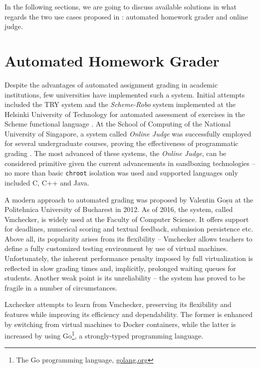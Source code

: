 In the following sections, we are going to discuss available solutions in what regards the two use cases proposed in : automated homework grader and online judge.


\section{Automated Homework Grader}
\label{sec:homework}

Despite the advantages of automated assignment grading in academic institutions, few universities have implemented such a system. Initial attempts included the TRY\cite{reek} system and the \textit{Scheme-Robo}\cite{saikkonen} system implemented at the Helsinki University of Technology for automated assessment of exercises in the Scheme functional language \cite{cheang}. At the School of Computing of the National University of Singapore, a system called \textit{Online Judge} was successfully employed for several undergraduate courses, proving the effectiveness of programmatic grading \cite{cheang}. The most advanced of these systems, the \textit{Online Judge}, can be considered primitive given the current advancements in sandboxing technologies -- no more than basic \texttt{chroot} isolation was used and supported languages only included C, C++ and Java.

A modern approach to automated grading was proposed by Valentin Goșu\cite{gosu} at the Politehnica University of Bucharest in 2012. As of 2016, the system, called Vmchecker, is widely used at the Faculty of Computer Science. It offers support for deadlines, numerical scoring and textual feedback, submission persistence etc. Above all, its popularity arises from its flexibility -- Vmchecker allows teachers to define a fully customized testing environment by use of virtual machines. Unfortunately, the inherent performance penalty imposed by full virtualization is reflected in slow grading times and, implicitly, prolonged waiting queues for students. Another weak point is its unreliability -- the system has proved to be fragile in a number of circumstances.

Lxchecker attempts to learn from Vmchecker, preserving its flexibility and features while improving its efficiency and dependability. The former is enhanced by switching from virtual machines to Docker containers, while the latter is increased by using Go\footnote{The Go programming language, \url{golang.org}}, a strongly-typed programming language.

